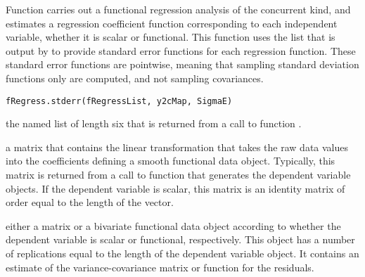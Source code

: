\begin{Description}\relax
Function  carries out a functional regression analysis
of the concurrent kind, and estimates a regression coefficient function
corresponding to each independent variable, whether it is scalar or
functional.  This function uses the list that is output by 
to provide standard error functions for each regression function.  These
standard error functions are pointwise, meaning that sampling standard
deviation functions only are computed, and not sampling covariances.
\end{Description}
\begin{Usage}
\begin{verbatim}
fRegress.stderr(fRegressList, y2cMap, SigmaE)
\end{verbatim}
\end{Usage}
\begin{Arguments}
\begin{ldescription}
\item[\code{fRegressList}] the named list of length six that is returned from a call to function
.

\item[\code{y2cMap}] a matrix that contains the linear transformation that
takes the raw data values into the coefficients defining a smooth
functional data object. Typically, this matrix is returned from a
call to function  that generates the
dependent variable objects.  If the dependent variable is scalar,
this matrix is an identity matrix of order equal to the length
of the vector.

\item[\code{SigmaE}] either a matrix or a bivariate functional data object
according to whether the dependent variable is scalar or functional,
respectively.
This object has a number of replications equal to
the length of the dependent variable object.  It contains an estimate
of the variance-covariance matrix or function for the residuals.

\end{ldescription}
\end{Arguments}
